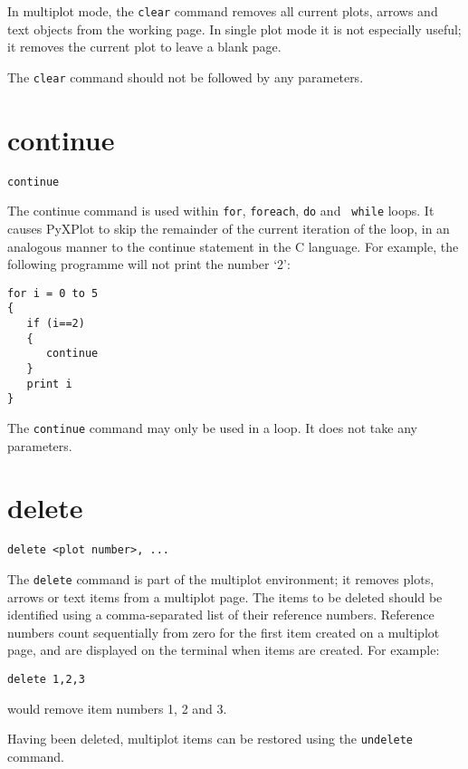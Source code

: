 In multiplot mode, the {\tt clear} command removes all current plots, arrows
and text objects from the working page. In single plot mode it is not
especially useful; it removes the current plot to leave a blank page.

The {\tt clear} command should not be followed by any parameters.


\section{continue}

\begin{verbatim}
continue
\end{verbatim}

The continue command is used within {\tt for}, {\tt foreach}, {\tt do} and {\tt
while} loops.  It causes PyXPlot to skip the remainder of the current iteration
of the loop, in an analogous manner to the continue statement in the C language.
For example, the following programme will not print the number `2':

\begin{verbatim}
for i = 0 to 5
{
   if (i==2)
   {
      continue
   }
   print i
}
\end{verbatim}

The {\tt continue} command may only be used in a loop.  It does not take any
parameters.


\section{delete}

\begin{verbatim}
delete <plot number>, ...
\end{verbatim}

The {\tt delete} command is part of the multiplot environment; it removes
plots, arrows or text items from a multiplot page. The items to be deleted should be
identified using a comma-separated list of their reference numbers.  Reference
numbers count sequentially from zero for the first item created on a multiplot
page, and are displayed on the terminal when items are created.  For example:

\begin{verbatim}
delete 1,2,3
\end{verbatim}

\noindent would remove item numbers 1, 2 and 3.

Having been deleted, multiplot items can be restored using the {\tt undelete}
command.



